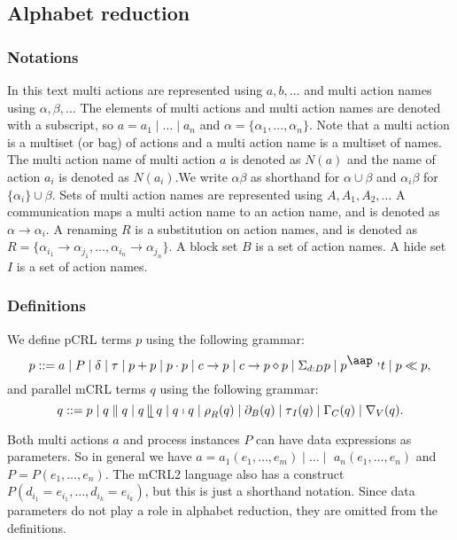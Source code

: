 \documentclass{article}
\begin{document}
\newpage

\subsection{Alphabet reduction}

\subsubsection{Notations}

In this text multi actions are represented using $a,b,\ldots $ and multi
action names using $\alpha ,\beta ,\ldots $ The elements of multi actions
and multi action names are denoted with a subscript, so $a=a_{1}\mid \ldots
\mid a_{n}$ and $\alpha =\{\alpha _{1},\ldots ,\alpha _{n}\}$. Note that a
multi action is a multiset (or bag) of actions and a multi action name is a
multiset of names. The multi action name of multi action $a$ is denoted as $%
N(a)$ and the name of action $a_{i}$ is denoted as $N(a_{i}).$We write $%
\alpha \beta $ as shorthand for $\alpha \cup \beta $ and $\alpha _{i}\beta $
for $\{\alpha _{i}\}\cup \beta $. Sets of multi action names are represented
using $A,A_{1},A_{2},\ldots $ A communication maps a multi action name to an
action name, and is denoted as $\alpha \rightarrow \alpha _{i}$. A renaming $%
R$ is a substitution on action names, and is denoted as $R=\{\alpha
_{i_{1}}\rightarrow \alpha _{j_{1}},\ldots ,\alpha _{i_{n}}\rightarrow
\alpha _{j_{n}}\}$. A block set $B$ is a set of action names. A hide set $I$
is a set of action names.

\subsubsection{Definitions}

We define pCRL terms $p$ using the following grammar:%
\[
p::=a\mid P\mid \delta \mid \tau \mid p+p\mid p\cdot p\mid c\rightarrow
p\mid c\rightarrow p\diamond p\mid \Sigma _{d:D}p\mid p^{%
\mathbin{\mbox{\aap
,}}}t\mid p\ll p, 
\]%
and parallel mCRL terms $q$ using the following grammar:%
\[
q::=p\mid q\parallel q\mid q\mathbin{\mathrel{\llfloor}}q\mid q\shortmid
q\mid \rho _{R}(q)\mid \partial _{B}(q)\mid \tau _{I}(q)\mid \Gamma
_{C}(q)\mid \nabla _{V}(q). 
\]

Both multi actions $a$ and process instances $P$ can have data expressions
as parameters. So in general we have $a=a_{1}(e_{1},\ldots ,e_{m})\mid
\ldots \mid $ $a_{n}(e_{1},\ldots ,e_{n})$ and $P=P(e_{1},\ldots ,e_{n})$.
The mCRL2 language also has a construct $P(d_{i_{1}}=e_{i_{1}},\ldots
,d_{i_{k}}=e_{i_{k}})$, but this is just a shorthand notation. Since data
parameters do not play a role in alphabet reduction, they are omitted from
the definitions.
\end{document}
